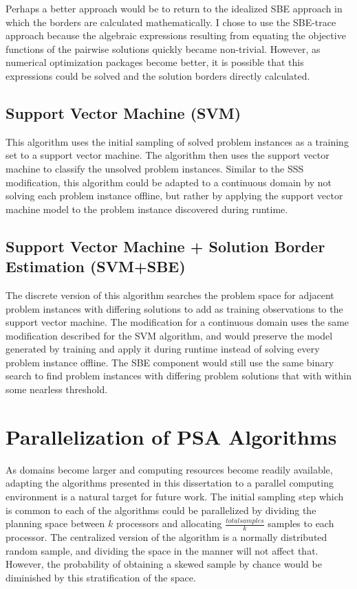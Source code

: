 Perhaps a better approach would be to return to the idealized SBE approach in which the borders are calculated mathematically. I chose to use the SBE-trace approach because the algebraic expressions resulting from equating the objective functions of the pairwise solutions quickly became non-trivial. However, as numerical optimization packages become better, it is possible that this expressions could be solved and the solution borders directly calculated.


\subsection{Support Vector Machine (SVM)}
This algorithm uses the initial sampling of solved problem instances as a training set to a support vector machine.  The algorithm then uses the support vector machine to classify the unsolved problem instances.  Similar to the SSS modification, this algorithm could be adapted to a continuous domain by not solving each problem instance offline, but rather by applying the support vector machine model to the problem instance discovered during runtime.

\subsection{Support Vector Machine + Solution Border Estimation (SVM+SBE)}
The discrete version of this algorithm searches the problem space for adjacent problem instances with differing solutions to add as training observations to the support vector machine.  The modification for a continuous domain uses the same modification described for the SVM algorithm, and would preserve the model generated by training and apply it during runtime instead of solving every problem instance offline.  The SBE component would still use the same binary search to find problem instances with differing problem solutions that with within some nearless threshold.

\section{Parallelization of PSA Algorithms}
\label{sec:parallelization}
As domains become larger and computing resources become  readily available, adapting the algorithms presented in this dissertation to a parallel computing environment is a natural target for future work.  The initial sampling step which is common to each of the algorithms could be parallelized by dividing the planning space between $k$ processors and allocating $\frac{total samples}{k}$ samples to each processor. The centralized version of the algorithm is a normally distributed random sample, and dividing the space in the manner will not affect that.  However, the probability of obtaining a skewed sample by chance would be diminished by this stratification of the space.

